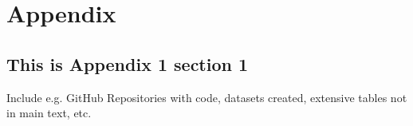 \chapter{Appendix}
\label{ch: appendix-1}

\section{This is Appendix 1 section 1}
Include e.g. GitHub Repositories with code, datasets created, extensive tables not in main text, etc.

